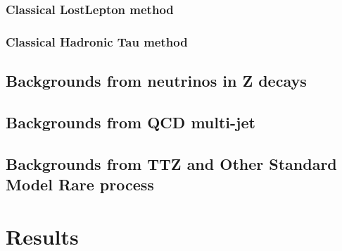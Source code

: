 \clearpage
\subsubsection{Classical LostLepton method}
\label{sec:c4bgll}


\clearpage
\subsubsection{Classical Hadronic Tau method}
\label{sec:c4bghadtau}


\clearpage
\subsection{Backgrounds from neutrinos in Z decays}
\label{sec:c4bgzinv}


\clearpage
\subsection{Backgrounds from QCD multi-jet}
\label{sec:c4bgqcd}


\clearpage
\subsection{Backgrounds from TTZ and Other Standard Model Rare process}
\label{sec:c4bgttzrare}


\clearpage
\section{Results}
\label{sec:c4results}

